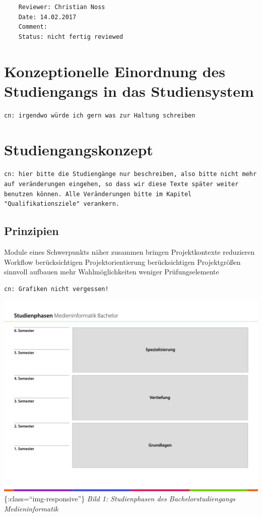 \begin{verbatim}
    Reviewer: Christian Noss
    Date: 14.02.2017
    Comment: 
    Status: nicht fertig reviewed
\end{verbatim}

\chapter{Konzeptionelle Einordnung des Studiengangs in das
Studiensystem}\label{konzeptionelle-einordnung-des-studiengangs-in-das-studiensystem}

\begin{verbatim}
cn: irgendwo würde ich gern was zur Haltung schreiben
\end{verbatim}

\chapter{Studiengangskonzept}\label{studiengangskonzept}

\begin{verbatim}
cn: hier bitte die Studiengänge nur beschreiben, also bitte nicht mehr auf veränderungen eingehen, so dass wir diese Texte später weiter benutzen können. Alle Veränderungen bitte im Kapitel "Qualifikationsziele" verankern.
\end{verbatim}

\section{Prinzipien}\label{prinzipien}

Module eines Schwerpunkts näher zusammen bringen Projektkontexte
reduzieren Workflow berücksichtigen Projektorientierung berücksichtigen
Projektgrößen sinnvoll aufbauen mehr Wahlmöglichkeiten weniger
Prüfungselemente

\begin{verbatim}
cn: Grafiken nicht vergessen!
\end{verbatim}

\includegraphics{../anhaenge/bilder/ba-studienphasen.001.jpeg}\{:class=``img-responsive''\}
\emph{Bild 1: Studienphasen des Bachelorstudiengangs Medieninformatik}

